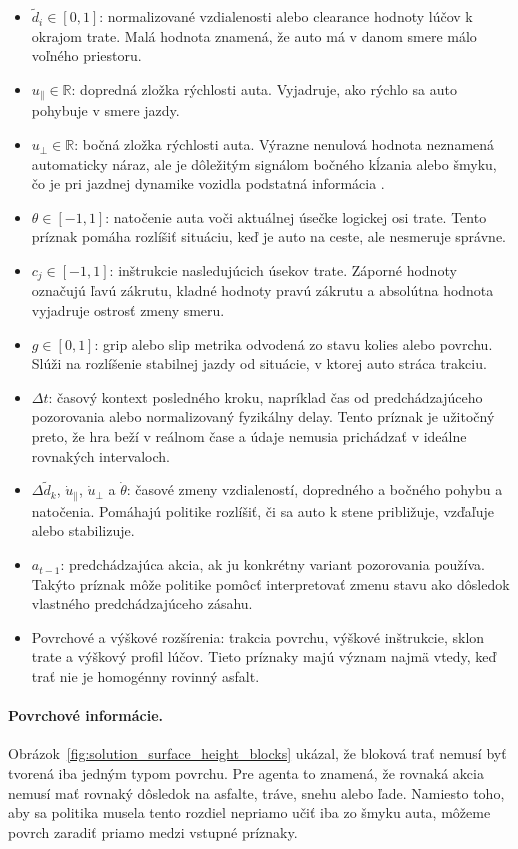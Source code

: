 \begin{itemize}
    \item \(\tilde{d}_i \in [0,1]\): normalizované vzdialenosti alebo clearance hodnoty lúčov k okrajom trate. Malá hodnota znamená, že auto má v danom smere málo voľného priestoru.
    \item \(u_{\parallel} \in \mathbb{R}\): dopredná zložka rýchlosti auta. Vyjadruje, ako rýchlo sa auto pohybuje v smere jazdy.
    \item \(u_{\perp} \in \mathbb{R}\): bočná zložka rýchlosti auta. Výrazne nenulová hodnota neznamená automaticky náraz, ale je dôležitým signálom bočného kĺzania alebo šmyku, čo je pri jazdnej dynamike vozidla podstatná informácia \cite{rajamani2012vehicle_dynamics}.
    \item \(\theta \in [-1,1]\): natočenie auta voči aktuálnej úsečke logickej osi trate. Tento príznak pomáha rozlíšiť situáciu, keď je auto na ceste, ale nesmeruje správne.
    \item \(c_j \in [-1,1]\): inštrukcie nasledujúcich úsekov trate. Záporné hodnoty označujú ľavú zákrutu, kladné hodnoty pravú zákrutu a absolútna hodnota vyjadruje ostrosť zmeny smeru.
    \item \(g \in [0,1]\): grip alebo slip metrika odvodená zo stavu kolies alebo povrchu. Slúži na rozlíšenie stabilnej jazdy od situácie, v ktorej auto stráca trakciu.
    \item \(\Delta t\): časový kontext posledného kroku, napríklad čas od predchádzajúceho pozorovania alebo normalizovaný fyzikálny delay. Tento príznak je užitočný preto, že hra beží v reálnom čase a údaje nemusia prichádzať v ideálne rovnakých intervaloch.
    \item \(\Delta \tilde{d}_k\), \(\dot{u}_{\parallel}\), \(\dot{u}_{\perp}\) a \(\dot{\theta}\): časové zmeny vzdialeností, dopredného a bočného pohybu a natočenia. Pomáhajú politike rozlíšiť, či sa auto k stene približuje, vzďaľuje alebo stabilizuje.
    \item \(a_{t-1}\): predchádzajúca akcia, ak ju konkrétny variant pozorovania používa. Takýto príznak môže politike pomôcť interpretovať zmenu stavu ako dôsledok vlastného predchádzajúceho zásahu.
    \item Povrchové a výškové rozšírenia: trakcia povrchu, výškové inštrukcie, sklon trate a výškový profil lúčov. Tieto príznaky majú význam najmä vtedy, keď trať nie je homogénny rovinný asfalt.
\end{itemize}

\paragraph{Povrchové informácie.}
Obrázok~\ref{fig:solution_surface_height_blocks} ukázal, že bloková trať nemusí byť tvorená iba jedným typom povrchu. Pre agenta to znamená, že rovnaká akcia nemusí mať rovnaký dôsledok na asfalte, tráve, snehu alebo ľade. Namiesto toho, aby sa politika musela tento rozdiel nepriamo učiť iba zo šmyku auta, môžeme povrch zaradiť priamo medzi vstupné príznaky.

